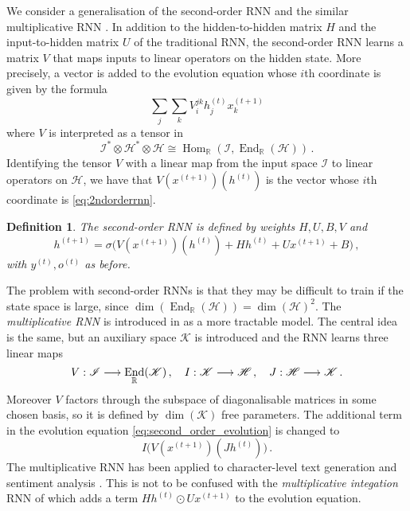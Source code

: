 \documentclass[english,letter paper,12pt,leqno]{article}
\theoremstyle{example}
\newtheorem{definition}[theorem]{Definition}
\numberwithin{equation}{section}
\def\Hom{\operatorname{Hom}}
\def\be{\begin{equation}}
\def\ee{\end{equation}}
\DeclareMathOperator{\End}{End}
\begin{document}
We consider a generalisation of the second-order RNN \cite{highorderrec,pollack,firstvsecond,secondorder} and the similar multiplicative RNN \cite{sutskever}. In addition to the hidden-to-hidden matrix $H$ and the input-to-hidden matrix $U$ of the traditional RNN, the second-order RNN learns a matrix $V$ that maps inputs to linear operators on the hidden state. More precisely, a vector is added to the evolution equation whose $i$th coordinate is given by the formula
\be\label{eq:2ndorderrnn}
\sum_j \sum_k V^{jk}_{i} h^{(t)}_j x^{(t+1)}_k
\ee
where $V$ is interpreted as a tensor in
\be\label{eq:input_to_operator}
\mathscr{I}^* \otimes \mathscr{H}^* \otimes \mathscr{H} \cong \Hom_{\mathbb{R}}(\mathscr{I} , \End_{\mathbb{R}}(\mathscr{H}))\,.
\ee
Identifying the tensor $V$ with a linear map from the input space $\mathscr{I}$ to linear operators on $\mathscr{H}$, we have that $V(x^{(t+1)})(h^{(t)})$ is the vector whose $i$th coordinate is \eqref{eq:2ndorderrnn}. 

\begin{definition} The second-order RNN \cite{highorderrec,pollack} is defined by weights $H,U,B,V$ and
\be\label{eq:second_order_evolution}
h^{(t+1)} = \sigma\big( V( x^{(t+1)} )(h^{(t)}) + H h^{(t)} + U x^{(t+1)} + B\big)\,,
\ee 
with $y^{(t)}, o^{(t)}$ as before.
\end{definition}

The problem with second-order RNNs is that they may be difficult to train if the state space is large, since $\dim(\End_{\mathbb{R}}(\mathscr{H})) = \dim(\mathscr{H})^2$. The \emph{multiplicative RNN} is introduced in \cite{sutskever} as a more tractable model. The central idea is the same, but an auxiliary space $\mathscr{K}$ is introduced and the RNN learns three linear maps
\be\label{eq:threelinearmaps}
V: \mathscr{I} \lto \End_{\mathbb{R}}(\mathscr{K})\,, \quad I: \mathscr{K} \lto \mathscr{H}\,, \quad J: \mathscr{H} \lto \mathscr{K}\,.
\ee
Moreover $V$ factors through the subspace of diagonalisable matrices in some chosen basis, so it is defined by $\dim(\mathscr{K})$ free parameters. The additional term in the evolution equation \eqref{eq:second_order_evolution} is changed to
\be\label{eq:new_term_mRNN}
I\big( V(x^{(t+1)})( J h^{(t)} ) \big)\,.
\ee
The multiplicative RNN has been applied to character-level text generation \cite{sutskever} and sentiment analysis \cite{irsoy}. This is not to be confused with the \emph{multiplicative integation} RNN of \cite{yuhai} which adds a term $H h^{(t)} \odot U x^{(t+1)}$ to the evolution equation.
\end{document}
